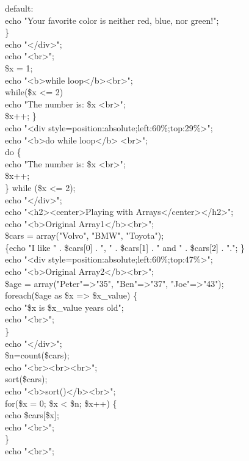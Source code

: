     default:\\
        echo "Your favorite color is neither red, blue, nor green!";\\
\}\\
echo "</div>";\\
echo "<br>";\\
\$x = 1;\\
echo "<b>while loop</b><br>";\\
while(\$x <= 2) {\\
    echo "The number is: \$x <br>";\\
    \$x++;
\}\\
echo "<div style=position:absolute;left:60\%;top:29\%>";\\
echo "<b>do while loop</b> <br>";\\
do \{\\
    echo "The number is: \$x <br>";\\
    \$x++;\\
\} while (\$x <= 2);\\
echo "</div>";\\
echo "<h2><center>Playing with Arrays</center></h2>";\\
echo "<b>Original Array1</b><br>";\\
\$cars = array("Volvo", "BMW", "Toyota");\\
\{echo "I like " . \$cars[0] . ", " . \$cars[1] . " and " . \$cars[2] . ".";
\}\\
echo "<div style=position:absolute;left:60\%;top:47\%>";\\
echo "<b>Original Array2</b><br>";\\
\$age = array("Peter"=>"35", "Ben"=>"37", "Joe"=>"43");\\
foreach(\$age as \$x => \$x\_value) \{\\
 echo  "\$x  is  \$x\_value years old";\\
    echo "<br>";\\
\}\\
echo "</div>";\\
\$n=count(\$cars);\\
echo "<br><br><br>";\\
sort(\$cars);\\
echo "<b>sort()</b><br>";\\
for(\$x = 0; \$x < \$n; \$x++) \{\\
    echo \$cars[\$x];\\
    echo "<br>";\\
\}\\
echo "<br>";\\
}
